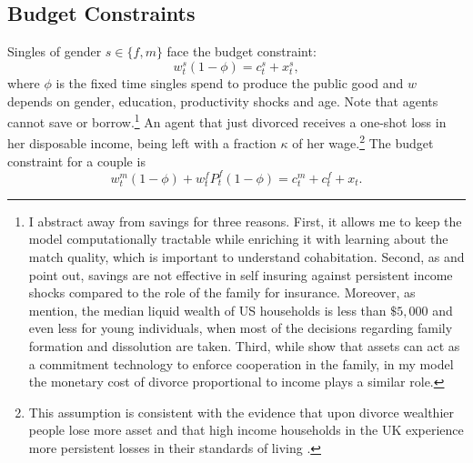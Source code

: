 \documentclass[12pt]{article}
\begin{document}
 \subsection{Budget Constraints}
Singles of gender $s\in\{f,m\}$ face the budget constraint:
\begin{equation}\label{eq:bcs}
w^s_t(1-\phi)=c^s_t+x^s_t,
\end{equation}
where $\phi$ is the fixed time singles spend to produce the public good and $w$ depends on gender, education, productivity shocks and age. Note that agents cannot save or borrow.\footnote{I abstract away from savings for three reasons. First, it allows me to keep the model computationally tractable while enriching it with learning about the match quality, which is important to understand cohabitation. Second, as \cite{wu2019} and \cite{blundell2016} point out, savings are not effective in self insuring against persistent income shocks compared to the role of the family for insurance. Moreover, as \cite{guvenen2015} mention, the median liquid wealth of US households is less than $\$5,000$ and even less for young individuals, when most of the decisions regarding family formation and dissolution are taken. Third, while \cite{lafortune2020} show that assets can act as a commitment technology to enforce cooperation in the family, in my model the monetary cost of divorce proportional to income plays a similar role.} An agent that just divorced receives a one-shot loss in her disposable income, being left with a fraction $\kappa$ of her wage.\footnote{This assumption is consistent with the evidence that upon divorce wealthier people lose more asset \citep{blasutto2020} and that high income households in the UK experience more persistent losses in their standards of living \citep{fisher2016}.} 
The budget constraint for a couple is
\begin{equation}\label{eq:bcm}
w^{m}_t(1-\phi)+w^{f}_tP^f_t(1-\phi)=c^{m}_t+c^{f}_t+x_t.
\end{equation}
\end{document}
